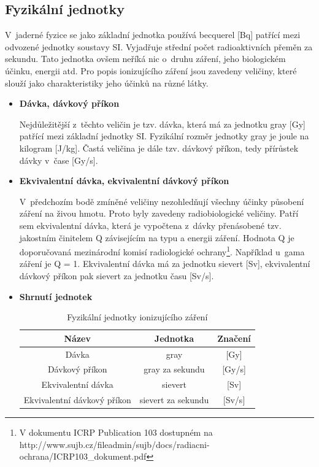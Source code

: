 \subsection{Fyzikální jednotky} V~jaderné fyzice se jako základní
jednotka používá becquerel [Bq] patřící mezi odvozené jednotky
soustavy SI. Vyjadřuje střední počet radioaktivních přeměn za
sekundu. Tato jednotka ovšem neříká nic o~druhu záření, jeho
biologickém účinku, energii atd. Pro popis ionizujícího záření jsou
zavedeny veličiny, které slouží jako charakteristiky jeho účinků na
různé látky. \cite{atomInfo}

\begin{itemize}
	\item \textbf{Dávka, dávkový příkon}
	
		 Nejdůležitější z~těchto veličin je tzv. dávka, která
má za jednotku gray [Gy] patřící mezi základní jednotky SI. Fyzikální
rozměr jednotky gray je joule na kilogram [J/kg]. Častá veličina je
dále tzv. dávkový příkon, tedy přírůstek dávky v~čase [Gy/s].
		
	\item \textbf{Ekvivalentní dávka, ekvivalentní dávkový příkon}

	 	V~předchozím bodě zmíněné veličiny nezohledňují
všechny účinky působení záření na živou hmotu. Proto byly zavedeny
radiobiologické veličiny. Patří sem ekvivalentní dávka, která je
vypočtena z~dávky přenásobené tzv. jakostním činitelem Q závisejícím
na typu a energii záření. Hodnota Q je doporučovaná mezinárodní komisí
radiologické ochrany\footnote{V dokumentu ICRP Publication 103
dostupném na
http://www.sujb.cz/fileadmin/sujb/docs/radiacni-ochrana/ICRP103\_dokument.pdf}. Například
u~gama záření je Q = 1. Ekvivalentní dávka má za jednotku sievert
[Sv], ekvivalentní dávkový příkon pak sievert za jednotku času [Sv/s].
	 	
	\item \textbf{Shrnutí jednotek}
	
		\begin{table}[h!]  \centering
			\caption{Fyzikální jednotky ionizujícího
záření}
			\label{tab:tabulkaJednotek}
			\begin{tabular}{|c|c|c|} \hline \textbf{Název}
& \textbf{Jednotka} & \textbf{Značení} \\ \hline Dávka & gray &
{[}Gy{]} \\ \hline Dávkový příkon & gray za sekundu & {[}Gy/s{]} \\
\hline Ekvivalentní dávka & sievert & {[}Sv{]} \\ \hline Ekvivalentní
dávkový příkon & sievert za sekundu & {[}Sv/s{]} \\ \hline
			\end{tabular}
		\end{table}
\end{itemize}

